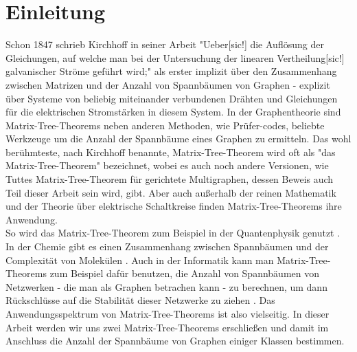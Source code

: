 \section{Einleitung}
Schon 1847 schrieb Kirchhoff in seiner Arbeit "Ueber[sic!] die Auflösung der Gleichungen, auf welche man bei der Untersuchung der linearen Vertheilung[sic!] galvanischer Ströme geführt wird;"\cite{kirchhoff_1847} als erster implizit über den Zusammenhang zwischen Matrizen und der Anzahl von Spannbäumen von Graphen - explizit über Systeme von beliebig miteinander verbundenen Drähten und Gleichungen für die elektrischen Stromstärken in diesem System.
In der Graphentheorie sind Matrix-Tree-Theorems neben anderen Methoden, wie Prüfer-codes, beliebte Werkzeuge um die Anzahl der Spannbäume eines Graphen zu ermitteln.
Das wohl berühmteste, nach Kirchhoff benannte, Matrix-Tree-Theorem wird oft als "das Matrix-Tree-Theorem" bezeichnet, wobei es auch noch andere Versionen, wie Tuttes Matrix-Tree-Theorem für gerichtete Multigraphen, dessen Beweis auch Teil dieser Arbeit sein wird, gibt.
Aber auch außerhalb der reinen Mathematik und der Theorie über elektrische Schaltkreise finden Matrix-Tree-Theorems ihre Anwendung.\\
So wird das Matrix-Tree-Theorem zum Beispiel in der Quantenphysik genutzt \cite{giovannetti_severini_2013}.
In der Chemie gibt es einen Zusammenhang zwischen Spannbäumen und der Complexität von Molekülen \cite{janezic_2015}.
Auch in der Informatik kann man Matrix-Tree-Theorems zum Beispiel dafür benutzen, die Anzahl von Spannbäumen von Netzwerken - die man als Graphen betrachen kann - zu berechnen, um dann Rück\-schlüsse auf die Stabilität dieser Netzwerke zu ziehen \cite{yakoubi_2019}.
Das Anwendungsspektrum von Matrix-Tree-Theorems ist also vielseitig.
In dieser Arbeit werden wir uns zwei Matrix-Tree-Theorems erschließen und damit im Anschluss die Anzahl der Spannbäume von Graphen einiger Klassen bestimmen.

